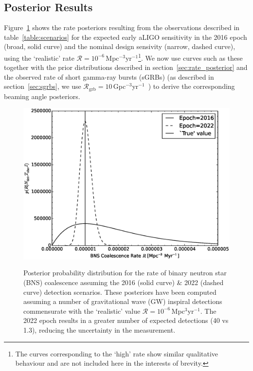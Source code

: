 \documentclass[twocolumn,nofootinbib]{revtex4-1}
\newcommand{\grbrate}{{{\mathcal R}_{\mathrm{grb}}}}
\newcommand{\cbcrate}{{{\mathcal R}}}
\def\bns#1{binary neutron star#1 (BNS#1)\gdef\bns{BNS}}
\def\gw#1{gravitational wave#1 (GW#1)\gdef\gw{GW}}
\def\sgrb#1{short gamma-ray burst#1 (sGRB#1)\gdef\sgrb{sGRB}}
\begin{document}
\subsection{Posterior Results}
Figure~\ref{fig:aligorate} shows the rate posteriors resulting from the
observations described in table~\ref{table:scenarios} for the expected early
aLIGO sensitivity in the 2016 epoch (broad, solid curve) and the nominal design
sensivity (narrow, dashed curve), using the `realistic' rate
$\cbcrate=10^{-6}$\,Mpc$^{-3}$yr$^{-1}$\footnote{The curves corresponding to the
`high' rate show similar qualitative behaviour and are not included here in the
interests of brevity.}.  We now use curves such as these together with the prior
distributions described in section~\ref{sec:rate_posterior} and the observed
rate of \sgrb{s} (as described in section~\ref{sec:sgrbs}, we use
$\grbrate=10$\,Gpc$^{-3}$yr$^{-1}$~\cite{nakar-2007,Dietz11}) to derive the
corresponding beaming angle posteriors.

\begin{figure}
\centering
{\includegraphics[width=\linewidth]{aligo_rate_re.eps}}
\caption{Posterior probability distribution for the rate of \bns{} coalescence
    assuming the 2016 (solid curve) \& 2022 (dashed curve) detection scenarios.
    These posteriors have been computed assuming a number of \gw{} inspiral
    detections commensurate with the `realistic' value
$\cbcrate=10^{-6}$\,Mpc$^{3}$yr$^{-1}$.  The 2022 epoch results in a greater
number of expected detections (40 vs 1.3), reducing the uncertainty in the
measurement.\label{fig:aligorate}}
\end{figure}
\end{document}
